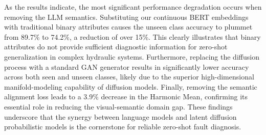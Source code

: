 As the results indicate, the most significant performance degradation occurs when removing the LLM semantics. Substituting our continuous BERT embeddings with traditional binary attributes causes the unseen class accuracy to plummet from 89.7\% to 74.2\%, a reduction of over 15\%. This clearly illustrates that binary attributes do not provide sufficient diagnostic information for zero-shot generalization in complex hydraulic systems. Furthermore, replacing the diffusion process with a standard GAN generator results in significantly lower accuracy across both seen and unseen classes, likely due to the superior high-dimensional manifold-modeling capability of diffusion models. Finally, removing the semantic alignment loss leads to a 3.9\% decrease in the Harmonic Mean, confirming its essential role in reducing the visual-semantic domain gap. These findings underscore that the synergy between language models and latent diffusion probabilistic models is the cornerstone for reliable zero-shot fault diagnosis.
